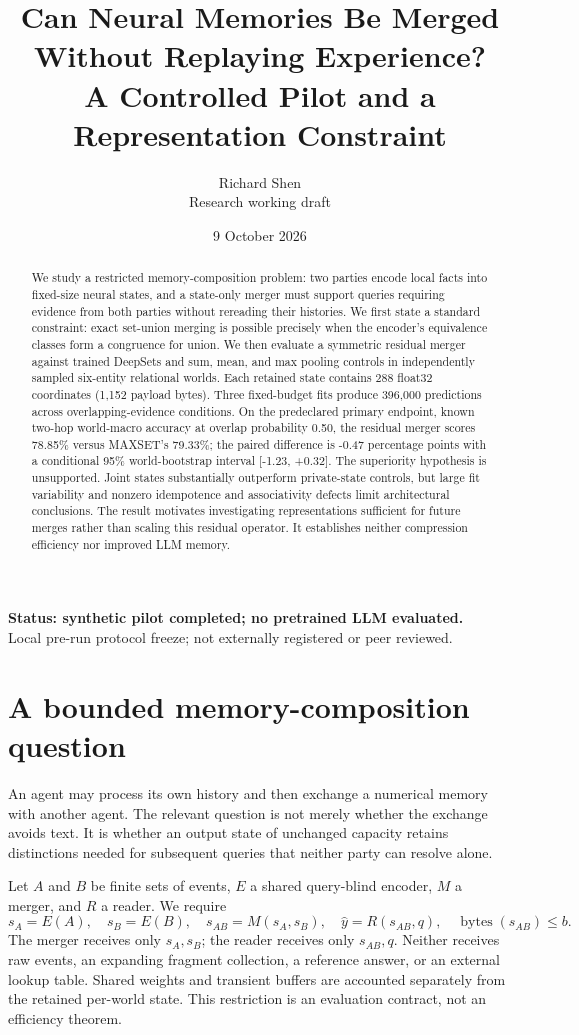 \documentclass[10pt]{article}
\title{Can Neural Memories Be Merged\\Without Replaying Experience?\\\large A Controlled Pilot and a Representation Constraint}
\author{Richard Shen\\\small Research working draft}
\date{9 October 2026}
\begin{document}
\maketitle
\begin{center}
\small\textbf{Status: synthetic pilot completed; no pretrained LLM evaluated.}\\
Local pre-run protocol freeze; not externally registered or peer reviewed.
\end{center}
\begin{abstract}
We study a restricted memory-composition problem: two parties encode local facts
into fixed-size neural states, and a state-only merger must support queries
requiring evidence from both parties without rereading their histories. We first
state a standard constraint: exact set-union merging is possible precisely when
the encoder's equivalence classes form a congruence for union. We then evaluate
a symmetric residual merger against trained DeepSets and sum, mean, and max
pooling controls in independently sampled six-entity relational worlds. Each
retained state contains 288 float32 coordinates (1,152 payload bytes). Three
fixed-budget fits produce 396,000 predictions across overlapping-evidence
conditions. On the predeclared primary endpoint, known two-hop world-macro
accuracy at overlap probability 0.50, the residual merger scores 78.85\% versus
MAXSET's 79.33\%; the paired difference is -0.47 percentage points with a
conditional 95\% world-bootstrap interval [-1.23, +0.32]. The superiority
hypothesis is unsupported. Joint states substantially outperform private-state
controls, but large fit variability and nonzero idempotence and associativity
defects limit architectural conclusions. The result motivates investigating
representations sufficient for future merges rather than scaling this residual
operator. It establishes neither compression efficiency nor improved LLM memory.
\end{abstract}

\section{A bounded memory-composition question}
An agent may process its own history and then exchange a numerical memory with
another agent. The relevant question is not merely whether the exchange avoids
text. It is whether an output state of unchanged capacity retains distinctions
needed for subsequent queries that neither party can resolve alone.

Let $A$ and $B$ be finite sets of events, $E$ a shared query-blind encoder,
$M$ a merger, and $R$ a reader. We require
\[
s_A=E(A),\quad s_B=E(B),\quad s_{AB}=M(s_A,s_B),\quad
\widehat y=R(s_{AB},q),\quad \operatorname{bytes}(s_{AB})\leq b.
\]
The merger receives only $s_A,s_B$; the reader receives only $s_{AB},q$.
Neither receives raw events, an expanding fragment collection, a reference
answer, or an external lookup table. Shared weights and transient buffers are
accounted separately from the retained per-world state. This restriction is
an evaluation contract, not an efficiency theorem.
\end{document}
